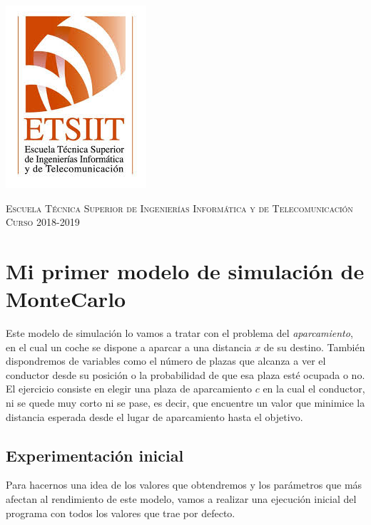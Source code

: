 \documentclass[11pt,a4paper]{report}
\begin{document}
\begin{titlepage}
\begin{minipage}{\textwidth}
\includegraphics[scale=0.3]{img/etsiit.jpeg}

\vspace{0.7cm}
\textsc{Escuela Técnica Superior de Ingenierías Informática y de Telecomunicación}\\
\vspace{1cm}
\textsc{Curso 2018-2019}
\end{minipage}
\end{titlepage}

\tableofcontents
\thispagestyle{empty}				%

\newpage

\setlength{\parskip}{1em}

\chapter{Mi primer modelo de simulación de MonteCarlo}

Este modelo de simulación lo vamos a tratar con el problema del \textit{aparcamiento}, en el cual un coche se dispone
a aparcar a una distancia $x$ de su destino. También dispondremos de variables como el número de plazas que alcanza a
ver el conductor desde su posición o la probabilidad de que esa plaza esté ocupada o no. El ejercicio consiste en elegir
una plaza de aparcamiento $c$ en la cual el conductor, ni se quede muy corto ni se pase, es decir, que encuentre un
valor que minimice la distancia esperada desde el lugar de aparcamiento hasta el objetivo.


\section{Experimentación inicial}

Para hacernos una idea de los valores que obtendremos y los parámetros que más afectan al rendimiento de este modelo,
vamos a realizar una ejecución inicial del programa con todos los valores que trae por defecto.
\end{document}
